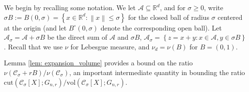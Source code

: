 \documentclass[11pt,twoside]{article}
\newcommand{\set}[1]{\left\{#1\right\}}
\newcommand{\vol}{\mathrm{vol}}
\newcommand{\cut}{\mathrm{cut}}
\newcommand{\Reals}{\mathbb{R}}
\newcommand{\Rd}{\Reals^d}
\newcommand{\norm}[1]{\left\lVert#1\right\rVert}
\newcommand{\1}{\mathbf{1}}
\newcommand{\Xbf}{X}             %
\newcommand{\Cset}{\mathcal{C}}
\newcommand{\Aset}{\mathcal{A}}
\newcommand{\Asig}{\Aset_{\sigma}}
\newcommand{\Csig}{\Cset_{\sigma}}
\begin{document}


We begin by recalling some notation. We let $\Aset \subseteq \Reals^d$, and for $\sigma \geq 0$, write $\sigma B := B(0,\sigma) = \set{x \in \Rd: \norm{x} \leq \sigma}$ for the closed ball of radius $\sigma$ centered at the origin (and let $B^{\circ}(0,\sigma)$ denote the corresponding open ball). Let $\Asig = \Aset + \sigma B$ be the direct sum of $\Aset$ and $\sigma B$, $\Asig = \set{z = x + y: x \in \Aset, y \in \sigma B}$. Recall that we use $\nu$ for Lebesgue measure, and $\nu_d = \nu(B)$ for $B = (0,1)$. 

Lemma \ref{lem: expansion_volume} provides a bound on the ratio $\nu(\Csig + r B) / \nu(\Csig)$, an important intermediate quantity in bounding the ratio $\cut(\Csig[\Xbf]; G_{n,r})/\vol(\Csig[\Xbf]; G_{n,r})$. 
\end{document}
